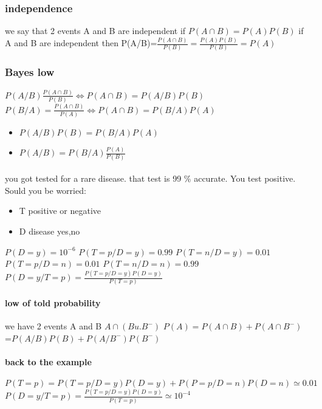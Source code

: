 \documentclass[a4paper,10pt]{article}
\begin{document}
\subsubsection{independence}
we say that 2 events A and B are independent if $P(A\cap B)=P(A)P(B)$
\newline
if A and B are independent then P(A/B)=$\frac{P(A\cap B)}{P(B)}=\frac{P(A)P(B)}{P(B)}=P(A)$
\subsubsection{Bayes low}
$P(A/B)\frac{P(A\cap B)}{P(B)}\Leftrightarrow P(A\cap B)=P(A/B)P(B)$
\newline
$P(B/A)=\frac{P(A\cap B)}{P(A)}\Leftrightarrow P(A\cap B)=P(B/A)P(A)$
\begin{itemize}
 \item $P(A/B)P(B)=P(B/A)P(A)$
 \item $P(A/B)=P(B/A)\frac{P(A)}{P(B)}$
\end{itemize}
\paragraph{}
you got  tested for a rare disease. that test is 99 \% accurate. You test positive. Sould you be worried:
\begin{itemize}
 \item T positive or negative
 \item D disease  yes,no
\end{itemize}
$P(D=y)=10^{-6}$
\newline
$P(T=p/D=y)=0.99$
\newline
$P(T=n/D=y)=0.01$
\newline
$P(T=p/D=n)=0.01$
\newline
$P(T=n/D=n)=0.99$
\newline
$P(D=y/T=p)=\frac{P(T=p/D=y)P(D=y)}{P(T=p)}$
\paragraph{low of told probability}
we have 2 events A and B
\newline
$A\cap (B u.  B^-)$
\newline
$P(A)=P(A\cap B)+P(A\cap B^-)$
\newline
=$P(A/B)P(B)+P(A/B^-)P(B^-)$
\paragraph{back to the example}
$P(T=p)=P(T=p/D=y)P(D=y)+P(P=p/D=n)P(D=n)\simeq 0.01$
\newline
$P(D=y/T=p)=\frac{P(T=p/D=y)P(D=y)}{P(T=p)}\simeq 10^{-4}$
\end{document}
